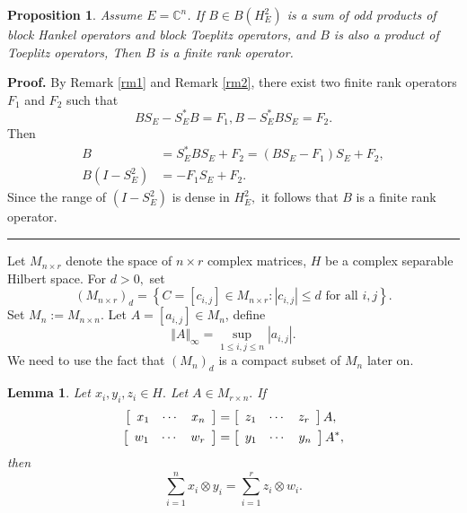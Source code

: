 \documentclass{article}%
\newtheorem{lemma}[theorem]{Lemma}
\newtheorem{proposition}[theorem]{Proposition}
\newenvironment{proof}[1][Proof]{\noindent\textbf{#1.} }{\ \rule{0.5em}{0.5em}}
\begin{document}
\begin{proposition}
Assume $E=\mathbb{C}^{n}$. If $B\in B(H_{E}^{2})$ is a sum of odd products of block Hankel operators and
block Toeplitz operators, and $B$ is also a product of Toeplitz operators,
Then $B$ is a finite rank operator.
\end{proposition}

\begin{proof}
By Remark \ref{rm1} and Remark \ref{rm2}, there exist two finite rank
operators $F_{1}$ and $F_{2}$ such that
\[
B{S_{E}}-S^{\ast}_{E}B=F_{1},B-S^{\ast}_{E}B{S_{E}}=F_{2}.
\]
Then%
\begin{align*}
B  &  =S^{\ast}_{E}B{S_{E}}+F_{2}=(BS_{E}-F_{1}){S_{E}}+F_{2},\\
B(I-{S_{E}^{2}})  &  =-F_{1}S_{E}+F_{2}.
\end{align*}
Since the range of $(I-S_{E}^{2})$ is dense in $H_{E}^{2},$ it follows that
$B$ is a finite rank operator.
\end{proof}

Let $M_{n\times r}$ denote the space of $n\times r$ complex matrices, $H$ be a
complex separable Hilbert space. For $d>0,$ set%
\[
\left(  M_{n\times r}\right)  _{d}=\left\{  C=\left[  c_{i,j}\right]  \in
M_{n\times r}:\left\vert c_{i,j}\right\vert \leq d\text{ for all }i,j\right\}
.
\]
Set $M_{n}:=M_{n\times n}$. Let $A=\left[  a_{i,j}\right]  \in M_{n}$, define
\[
\Vert A\Vert_{\infty}=\sup_{1\leq i,j\leq n}\left\vert a_{i,j}\right\vert .
\]
We need to use the fact that $\left(  M_{n}\right)  _{d}$ is a compact subset
of $M_{n}$ later on.

\begin{lemma}
\label{xy0}Let $x_{i},y_{i},z_{i}\in H.$ Let $A\in M_{r\times n}.$ If
\begin{align*}
\left[
\begin{array}
[c]{ccc}%
x_{1} & \cdots & x_{n}%
\end{array}
\right]   &  =\left[
\begin{array}
[c]{ccc}%
z_{1} & \cdots & z_{r}%
\end{array}
\right]  A,\\
\left[
\begin{array}
[c]{ccc}%
w_{1} & \cdots & w_{r}%
\end{array}
\right]   &  =\left[
\begin{array}
[c]{ccc}%
y_{1} & \cdots & y_{n}%
\end{array}
\right]  A^{\ast},
\end{align*}
then%
\[
\sum_{i=1}^{n}x_{i}\otimes y_{i}=\sum_{i=1}^{r}z_{i}\otimes w_{i}.
\]

\end{lemma}
\end{document}

